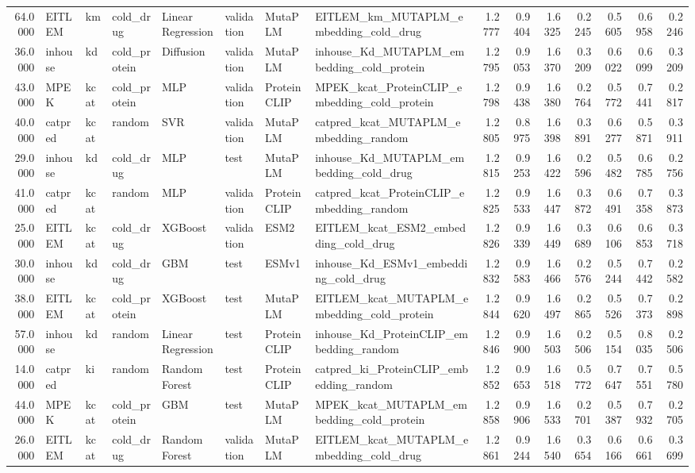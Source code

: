 \begin{tabular}{rlllllllrrrrrrr}
64.0000 & EITLEM & km & cold_drug & Linear Regression & validation & MutaPLM & EITLEM_km_MUTAPLM_embedding_cold_drug & 1.2777 & 0.9404 & 1.6325 & 0.2245 & 0.5605 & 0.6958 & 0.2246 \\
36.0000 & inhouse & kd & cold_protein & Diffusion & validation & MutaPLM & inhouse_Kd_MUTAPLM_embedding_cold_protein & 1.2795 & 0.9053 & 1.6370 & 0.3209 & 0.6022 & 0.6099 & 0.3209 \\
43.0000 & MPEK & kcat & cold_protein & MLP & validation & ProteinCLIP & MPEK_kcat_ProteinCLIP_embedding_cold_protein & 1.2798 & 0.9438 & 1.6380 & 0.2764 & 0.5772 & 0.7441 & 0.2817 \\
40.0000 & catpred & kcat & random & SVR & validation & MutaPLM & catpred_kcat_MUTAPLM_embedding_random & 1.2805 & 0.8975 & 1.6398 & 0.3891 & 0.6277 & 0.5871 & 0.3911 \\
29.0000 & inhouse & kd & cold_drug & MLP & test & MutaPLM & inhouse_Kd_MUTAPLM_embedding_cold_drug & 1.2815 & 0.9253 & 1.6422 & 0.2596 & 0.5482 & 0.6785 & 0.2756 \\
41.0000 & catpred & kcat & random & MLP & validation & ProteinCLIP & catpred_kcat_ProteinCLIP_embedding_random & 1.2825 & 0.9533 & 1.6447 & 0.3872 & 0.6491 & 0.7358 & 0.3873 \\
25.0000 & EITLEM & kcat & cold_drug & XGBoost & validation & ESM2 & EITLEM_kcat_ESM2_embedding_cold_drug & 1.2826 & 0.9339 & 1.6449 & 0.3689 & 0.6106 & 0.6853 & 0.3718 \\
30.0000 & inhouse & kd & cold_drug & GBM & test & ESMv1 & inhouse_Kd_ESMv1_embedding_cold_drug & 1.2832 & 0.9583 & 1.6466 & 0.2576 & 0.5244 & 0.7442 & 0.2582 \\
38.0000 & EITLEM & kcat & cold_protein & XGBoost & test & MutaPLM & EITLEM_kcat_MUTAPLM_embedding_cold_protein & 1.2844 & 0.9620 & 1.6497 & 0.2865 & 0.5526 & 0.7373 & 0.2898 \\
57.0000 & inhouse & kd & random & Linear Regression & test & ProteinCLIP & inhouse_Kd_ProteinCLIP_embedding_random & 1.2846 & 0.9900 & 1.6503 & 0.2506 & 0.5154 & 0.8035 & 0.2506 \\
14.0000 & catpred & ki & random & Random Forest & test & ProteinCLIP & catpred_ki_ProteinCLIP_embedding_random & 1.2852 & 0.9653 & 1.6518 & 0.5772 & 0.7647 & 0.7551 & 0.5780 \\
44.0000 & MPEK & kcat & cold_protein & GBM & test & MutaPLM & MPEK_kcat_MUTAPLM_embedding_cold_protein & 1.2858 & 0.9906 & 1.6533 & 0.2701 & 0.5387 & 0.7932 & 0.2705 \\
26.0000 & EITLEM & kcat & cold_drug & Random Forest & validation & MutaPLM & EITLEM_kcat_MUTAPLM_embedding_cold_drug & 1.2861 & 0.9244 & 1.6540 & 0.3654 & 0.6166 & 0.6661 & 0.3699 \\

\end{tabular}
